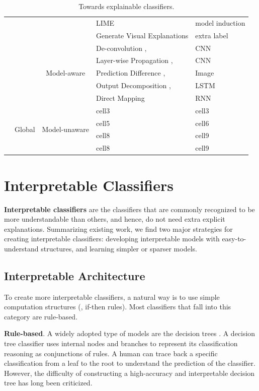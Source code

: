 \begin{table}[hb]
\begin{tabular}{ |c|c|c|p{15em}|p{7.5em}| }
  \cline{4-5}
  & & & LIME \cite{ribeiro2016kdd} & model induction \\ 
  \cline{4-5}
  & & & Generate Visual Explanations \cite{hendricks16generate} & extra label \\ 
  \cline{3-5}
  & & \multirow{5}{4em}{\centering Model-aware}
  & De-convolution \cite{zeiler2014eccv}, & CNN \\
  & & & Layer-wise Propagation \cite{bach15plos}, & CNN \\
  & & & Prediction Difference \cite{zintgraf17visualize}, & Image \\
  & & & Output Decomposition \cite{murdoch2017rule}, & LSTM \\
  & & & Direct Mapping \cite{karpathy16rnn} & RNN \\
  \cline{2-5}
  & \multirow{4}{3em}{\centering Global} & \multirow{4}{4em}{\centering Model-unaware}
  & cell3 & cell3  \\ 
  & & & cell5 & cell6  \\ 
  & & & cell8 & cell9 \\
  & & & cell8 & cell9 \\ 
  \hline
\end{tabular}
\caption{Towards explainable classifiers.}
\label{tab:explainable-methods}
\end{table}

\section{Interpretable Classifiers}\label{sec:interpretable-classifier}

\textbf{Interpretable classifiers} are the classifiers that are commonly recognized to be more understandable than others, and hence, do not need extra explicit explanations. Summarizing existing work, we find two major strategies for creating interpretable classifiers: developing interpretable models with easy-to-understand structures, and learning simpler or sparser models.

\subsection{Interpretable Architecture}

To create more interpretable classifiers, a natural way is to use simple computation structures (\eg, if-then rules). Most classifiers that fall into this category are rule-based. 

\textbf{Rule-based}. A widely adopted type of models are the decision trees \cite{breiman1984classificationtree}. A decision tree classifier uses internal nodes and branches to represent its classification reasoning as conjunctions of rules. A human can trace back a specific classification from a leaf to the root to understand the prediction of the classifier. However, the difficulty of constructing a high-accuracy and interpretable decision tree has long been criticized. 

